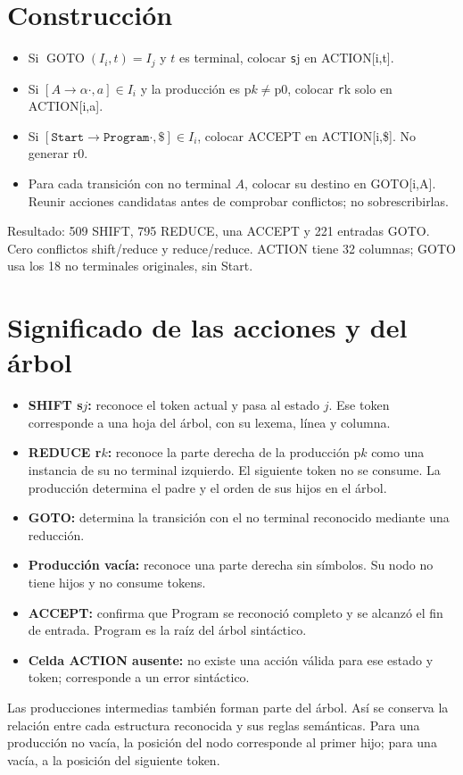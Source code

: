 

\section*{Construcción}
\begin{itemize}
\item Si $\operatorname{GOTO}(I_i,t)=I_j$ y $t$ es terminal, colocar \texttt{s}j en ACTION[i,t].
\item Si $[A\to\alpha\cdot,a]\in I_i$ y la producción es p$k\ne$p0, colocar \texttt{r}k solo en ACTION[i,a].
\item Si $[\texttt{Start}\to\texttt{Program}\cdot,\$]\in I_i$, colocar ACCEPT en ACTION[i,\$]. No generar r0.
\item Para cada transición con no terminal $A$, colocar su destino en GOTO[i,A]. Reunir acciones candidatas antes de comprobar conflictos; no sobrescribirlas.
\end{itemize}
Resultado: 509 SHIFT, 795 REDUCE, una ACCEPT y 221 entradas GOTO. Cero conflictos shift/reduce y reduce/reduce. ACTION tiene 32 columnas; GOTO usa los 18 no terminales originales, sin Start.
\section*{Significado de las acciones y del árbol}
\begin{itemize}
\item \textbf{SHIFT s$j$:} reconoce el token actual y pasa al estado $j$. Ese token corresponde a una hoja del árbol, con su lexema, línea y columna.
\item \textbf{REDUCE r$k$:} reconoce la parte derecha de la producción p$k$ como una instancia de su no terminal izquierdo. El siguiente token no se consume. La producción determina el padre y el orden de sus hijos en el árbol.
\item \textbf{GOTO:} determina la transición con el no terminal reconocido mediante una reducción.
\item \textbf{Producción vacía:} reconoce una parte derecha sin símbolos. Su nodo no tiene hijos y no consume tokens.
\item \textbf{ACCEPT:} confirma que Program se reconoció completo y se alcanzó el fin de entrada. Program es la raíz del árbol sintáctico.
\item \textbf{Celda ACTION ausente:} no existe una acción válida para ese estado y token; corresponde a un error sintáctico.
\end{itemize}
Las producciones intermedias también forman parte del árbol. Así se conserva la relación entre cada estructura reconocida y sus reglas semánticas. Para una producción no vacía, la posición del nodo corresponde al primer hijo; para una vacía, a la posición del siguiente token.

